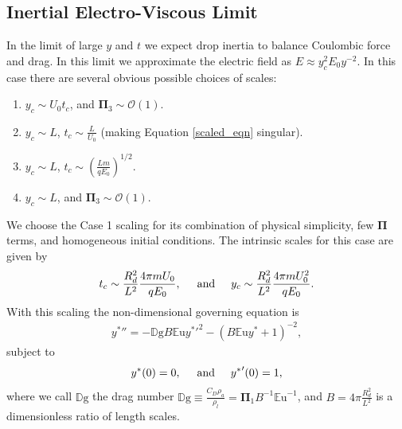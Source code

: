 \documentclass[12pt,a4paper,oneside]{book}
\begin{document}
\subsection{Inertial Electro-Viscous Limit}
In the limit of large $y$ and $t$ we expect drop inertia to balance Coulombic force and drag. In this limit we approximate the electric field as $E \approx y_c^2 E_0 y^{-2}$. In this case there are several obvious possible choices of scales:
\begin{enumerate}
\item $y_c \sim U_0 t_c$, and $\mathbf{\Pi}_3 \sim \mathcal{O}(1)$.
\item $y_c \sim L$, $t_c \sim \frac{L}{U_0}$ (making Equation \ref{scaled_eqn} singular).
\item $y_c \sim L$, $t_c \sim \left( \frac{L m}{q E_0} \right)^{1/2}$.
\item $y_c \sim L$, and $\mathbf{\Pi}_3 \sim \mathcal{O}(1)$.
\end{enumerate}

We choose the Case 1 scaling for its combination of physical simplicity, few $\mathbf{\Pi}$ terms, and homogeneous initial conditions. The intrinsic scales for this case are given by
\[ t_c \sim \frac{R_d^2}{L^2} \frac{4 \pi m U_0}{q E_0}, \hspace{5mm} \mbox{and} \hspace{5 mm} y_c \sim \frac{R_d^2}{L^2} \frac{4 \pi m U_0^2}{q E_0}.
\]
With this scaling the non-dimensional governing equation is 
\begin{eqnarray}
&{y^*}'' = - \mathbb{D}\mbox{g} B \mathbb{E}\mbox{u} {y^*}'^2 - \left( B \mathbb{E}\mbox{u} {y^*} + 1 \right)^{-2}, & \label{drag_limit}
\end{eqnarray}
subject to 
\begin{equation*}
{y^*}(0) = 0, \hspace{5 mm} \mbox{and} \hspace{5 mm} {y^*}'(0) = 1, 
\end{equation*}
where we call $\mathbb{D}\mbox{g}$ the drag number $\mathbb{D}\mbox{g} \equiv \frac{C_D \rho_a}{\rho_l} = \mathbf{\Pi}_1 B^{-1}{\mathbb{E}\mbox{u}}^{-1}$, and $B = 4 \pi \frac{R_d^2}{L^2}$ is a dimensionless ratio of length scales.
\end{document}
